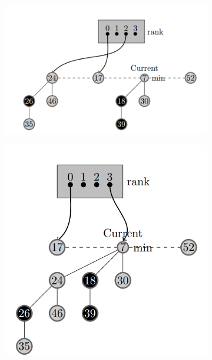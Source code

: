 \documentclass[14pt,a4paper]{report}
\begin{document}
\begin{figure}[H]
\begin{subfigure}[H]{0.4\textwidth}
         \centering
         \includegraphics[width=\textwidth]{e3.png}
         \caption{}
         \label{fig:e3}
     \end{subfigure}
     \hspace*{\fill}
\begin{subfigure}[H]{0.4\textwidth}
         \centering
         \includegraphics[width=\textwidth]{e4.png}
         \caption{}
         \label{fig:e4}
     \end{subfigure}
     

\end{figure}
\end{document}
